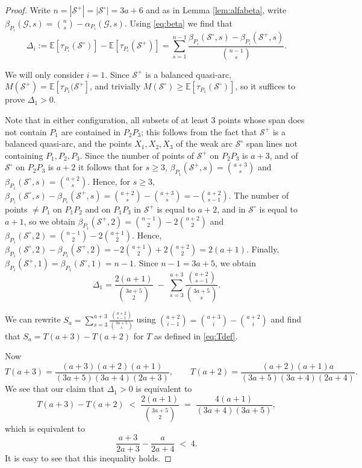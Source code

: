 \documentclass{article}
\newcommand{\Gscr}{\mathscr{G}}
\newcommand{\E}{\mathbb{E}}
\begin{document}
\begin{proof}
Write $n=|\mathcal{S}^{+}|=|\mathcal{S}^{\circ}|=3a+6$ and as in Lemma \ref{lem:alfabeta}, write $\beta_{P_i}(\Gscr,s)=\binom{n}{s}-\alpha_{P_i}(\Gscr,s)$. Using
\eqref{eq:beta} we find that
\[
\Delta_i
:=\E[\tau_{P_i}(\mathcal{S}^{\circ})]-\E[\tau_{P_i}(\mathcal{S}^{+})]
=\sum_{s=1}^{n-1}
    \frac{\beta_{P_i}(\mathcal{S}^{\circ},s)-\beta_{P_i}(\mathcal{S}^{+},s)}{\binom{n-1}{s}} .\]


We will only consider $i=1$. Since $\mathcal{S}^{+}$ is a balanced quasi-arc,  $M(\mathcal{S}^{+})=\E[\tau_{P_1}(\mathcal{S}^{+}]$, and trivially
$M(\mathcal{S}^{\circ})\ge\E[\tau_{P_1}(\mathcal{S}^{\circ})]$, so it suffices to
prove $\Delta_1>0$.

{Note that in either configuration, all subsets of at least $3$ points whose span does not contain $P_1$ are contained in $P_2P_3$; this follows from the fact that $\mathcal{S}^+$ is a balanced quasi-arc, and the points $X_1,X_2,X_3$ of the weak arc $\mathcal{S}^\circ$ span lines not containing $P_1,P_2,P_3$. Since the number of points of $\mathcal{S}^+$ on $P_2P_3$ is $a+3$, and of $\mathcal{S}^{\circ}$ on $P_2P_3$ is $a+2$ it follows that for $s\geq 3$, $\beta_{P_1}(\mathcal{S}^+,s)=\binom{a+3}{s}$ and $\beta_{P_1}(\mathcal{S}^{\circ},s)=\binom{a+2}{s}$. Hence, for $s\geq 3$, $\beta_{P_1}(\mathcal{S}^{\circ},s)-\beta_{P_1}(\mathcal{S}^{+},s)=\binom{a+2}{s}-\binom{a+3}{s}=-\binom{a+2}{s-1}.$
The number of points $\neq P_1$ on $P_1P_2$ and on $P_1P_3$ in $\mathcal{S}^+$ is equal to $a+2$, and in $\mathcal{S}^\circ$ is equal to $a+1$, so we obtain
$\beta_{P_1}(\mathcal{S}^+,2)=\binom{n-1}{2}-2\binom{a+2}{2}$ and $\beta_{P_1}(\mathcal{S}^\circ,2)=\binom{n-1}{2}-2\binom{a+1}{2}$. Hence, 
$\beta_{P_1}(\mathcal{S}^\circ,2)-\beta_{P_1}(\mathcal{S}^+,2)
=-2\binom{a+1}{2}+2\binom{a+2}{2}=2(a+1).$
Finally, $\beta_{P_1}(\mathcal{S}^+,1)=\beta_{P_1}(\mathcal{S}^\circ,1)=n-1.$}
Since $n-1=3a+5$, we obtain
\[
\Delta_1
=\frac{2(a+1)}{\binom{3a+5}{2}}
 \;-\;\sum_{s=3}^{a+3}\frac{\binom{a+2}{s-1}}{\binom{3a+5}{s}} .
\]


We can rewrite $S_a=\sum_{s=3}^{a+3}\frac{\binom{a+2}{s-1}}{\binom{3a+5}{s}}$ using $\binom{a+2}{i-1}=\binom{a+3}{i}-\binom{a+2}{i}$ and find that $
S_a=T(a+3)-T(a+2)$ for $T$ as defined in \eqref{eq:Tdef}.

Now
\[
T(a+3)=\frac{(a+3)(a+2)(a+1)}{(3a+5)(3a+4)(2a+3)},
\qquad
T(a+2)=\frac{(a+2)(a+1)a}{(3a+5)(3a+4)(2a+4)}.
\]
We see that our claim that $\Delta_1>0$ is equivalent to
\[
T(a+3)-T(a+2)\;<\;\frac{2(a+1)}{\binom{3a+5}{2}}
\;=\;\frac{4(a+1)}{(3a+4)(3a+5)},
\]
which is equivalent to
\[
\frac{a+3}{2a+3}-\frac{a}{2a+4}\;<\;4.
\]
It is easy to see that this inequality holds.
\end{proof}
\end{document}
